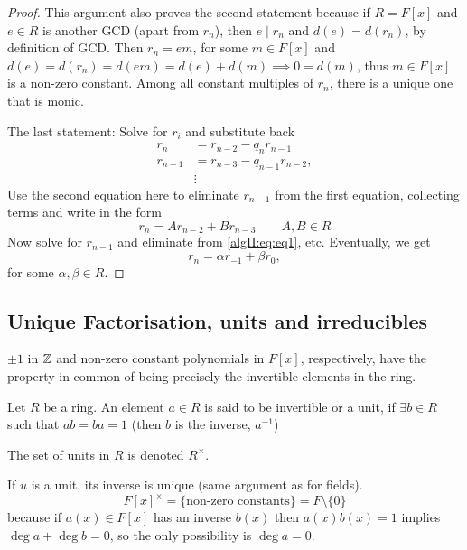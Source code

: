 \documentclass[10pt, a4paper]{article}
\begin{document}
\begin{theorem}
\begin{proof}
        This argument also proves the second statement because if $R = F[x]$ and $e \in R$ is another GCD
        (apart from $r_n$),
        then $e \mid r_n$ and $d(e) = d(r_n)$,
        by definition of GCD.
        Then $r_n = em$,
        for some $m \in F[x]$ and $d(e) = d(r_n) = d(em) = d(e) + d(m) \implies 0 = d(m)$,
        thus $m \in F[x]$ is a non-zero constant.
        Among all constant multiples of $r_n$,
        there is a unique one that is monic.

        The last statement:
        Solve for $r_i$ and substitute back
        \begin{align*}
            r_n &= r_{n - 2} - q_nr_{n - 1} \\
            r_{n - 1} &= r_{n - 3} - q_{n - 1}r_{n - 2}, \\
            &\vdots
        \end{align*}
        Use the second equation here to eliminate $r_{n - 1}$ from the first equation,
        collecting terms and write in the form
        \begin{equation}\tag{*}\label{algII:eq:eq1}
            r_n = Ar_{n - 2} + Br_{n - 3}\qquad A, B \in R
        \end{equation}
        Now solve for $r_{n - 1}$ and eliminate from \eqref{algII:eq:eq1},
        etc.
        Eventually,
        we get
        \[
        r_n = \alpha r_{-1} + \beta r_0,
        \]
        for some $\alpha, \beta \in R$.
    \end{proof}
\end{theorem}

\subsection{Unique Factorisation,
units and irreducibles}
$\pm 1$ in $\mathbb{Z}$ and non-zero constant polynomials in $F[x]$,
respectively,
have the property in common of being precisely the invertible elements in the ring.

\begin{definition}
    Let $R$ be a ring.
    An element $a \in R$ is said to be invertible or a unit,
    if $\exists b \in R$ such that $ab = ba = 1$
    (then $b$ is the inverse,
    $a ^ {-1}$)

    The set of units in $R$ is denoted $R ^ {\times}$.
\end{definition}

If $u$ is a unit,
its inverse is unique
(same argument as for fields).
\[
F[x] ^ {\times} = \{\text{non-zero constants}\} = F \setminus \{0\}
\]
because if $a(x) \in F[x]$ has an inverse $b(x)$ then $a(x)b(x) = 1$ implies $\deg{a} + \deg{b} = 0$,
so the only possibility is $\deg{a} = 0$.
\end{document}

